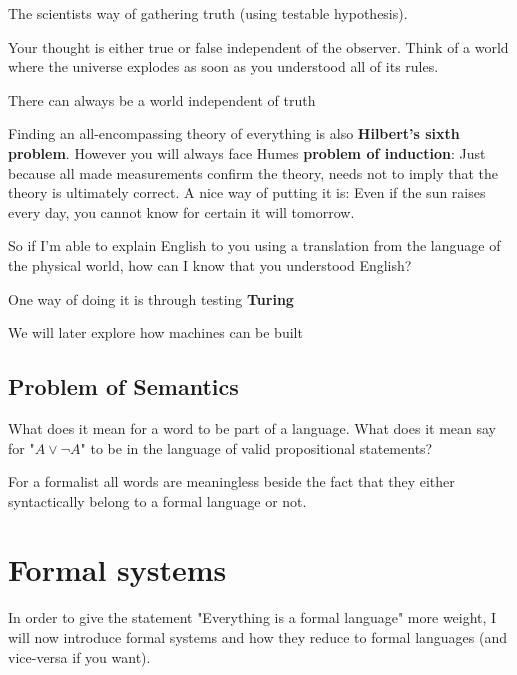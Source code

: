 The scientists way of gathering truth (using testable hypothesis).


Your thought is either true or false independent of the observer. Think of a world where the universe explodes as soon as you understood all of its rules.

There can always be a world independent of truth






Finding an all-encompassing theory of everything is also \textbf{Hilbert's sixth problem}.
However you will always face Humes \textbf{problem of induction}: Just because all made measurements confirm the theory, needs not to imply that the theory is ultimately correct. A nice way of putting it is: Even if the sun raises every day, you cannot know for certain it will tomorrow.


So if I'm able to explain English to you using a translation from the language of the physical world, how can I know that you understood English?

One way of doing it is through testing \textbf{Turing} 

We will later explore how machines can be built 

\subsection{Problem of Semantics}
What does it mean for a word to be part of a language. What does it mean say for "$A \vee \neg A$" to be in the language of valid propositional statements?
 
For a formalist all words are meaningless beside the fact that they either syntactically belong to a formal language or not.




\section{Formal systems}
In order to give the statement "Everything is a formal language" more weight, I will now introduce formal systems and how they reduce to formal languages (and vice-versa if you want).






